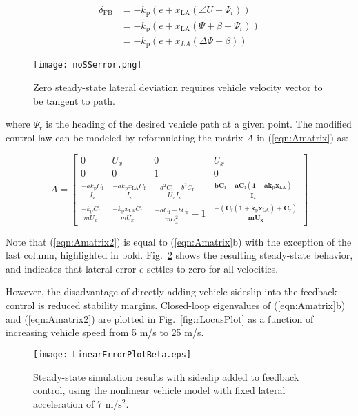 \begin{subequations}
\label{eqn:vveq}
\begin{align}
        \delta_\mathrm{FB} & = -k_\mathrm{p} \left(e+x_\mathrm{LA} (\angle U-\Psi_\mathrm{r} ) \right) \\
                           & =  -k_\mathrm{p} \left(e+x_\mathrm{LA} (\Psi+\beta-\Psi_\mathrm{r} ) \right) \\
						   & = -k_\mathrm{p} \left(e+x_{LA}(\Delta\Psi+\beta) \right)
\end{align}
\end{subequations}

 \begin{figure}[h]
\centering
\texttt{[image: noSSerror.png]}
\caption{Zero steady-state lateral deviation requires vehicle velocity vector
to be tangent to path.}
\label{fig:noSSerror}
\end{figure} 
\noindent where $\Psi_\mathrm{r}$ is the heading of the desired vehicle path at a given point. The modified control law can be modeled by reformulating the matrix $A$ in (\ref{eqn:Amatrix}) as:
 
\begin{equation}
\label{eqn:Amatrix2}
A  = 
 \begin{bmatrix}
  0 & U_x & 0 & U_x \\
  0 & 0 & 1 & 0 \\
  \frac{-ak_\mathrm{p} C_\mathrm{f}}{I_\mathrm{z}}  & \frac{-ak_\mathrm{p}x_\mathrm{LA}C_\mathrm{f}}{I_\mathrm{z}}  & \frac{-a^2C_\mathrm{f}-b^2C_\mathrm{r}}{U_xI_\mathrm{z}} & \mathbf{\frac{bC_\mathrm{r} - aC_\mathrm{f}(1-ak_\mathrm{p}x_\mathrm{LA}) }{I_\mathrm{z}}}  \\
  \frac{-k_\mathrm{p}C_\mathrm{f}}{mU_x}  & \frac{-k_\mathrm{p}x_\mathrm{LA}C_\mathrm{f}}{mU_x}  & \frac{-aC_\mathrm{f}-bC_\mathrm{r}}{mU_x^2}-1 & \mathbf{\frac{-(C_\mathrm{f}(1+k_\mathrm{p}x_\mathrm{LA}) + C_\mathrm{r})}{mU_x}}
 \end{bmatrix}
 \end{equation}
  
Note that (\ref{eqn:Amatrix2}) is equal to (\ref{eqn:Amatrix}b) with the exception of the last column, highlighted
in bold. Fig.~\ref{fig:linError2} shows the resulting steady-state behavior, and indicates that lateral error $e$ settles to
zero for all velocities. 

However, the disadvantage of directly adding vehicle sideslip 
into the feedback control is reduced stability margins. Closed-loop eigenvalues of (\ref{eqn:Amatrix}b) and (\ref{eqn:Amatrix2})
are plotted in Fig.~\ref{fig:rLocusPlot} as a function of increasing vehicle speed from 5 m/s to 25 m/s.
\begin{figure}[h]
\centering
\texttt{[image: LinearErrorPlotBeta.eps]}
\caption[Steady-state simulation results with sideslip added to feedback control]{Steady-state simulation results with sideslip added to feedback control, using the nonlinear vehicle model with fixed lateral acceleration of 7 $\mathrm{m/s^2}$.}
\label{fig:linError2}
\end{figure} 

